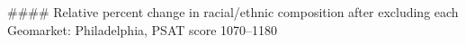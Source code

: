 #### Relative percent change in racial/ethnic composition after excluding each Geomarket: Philadelphia, PSAT score 1070–1180
